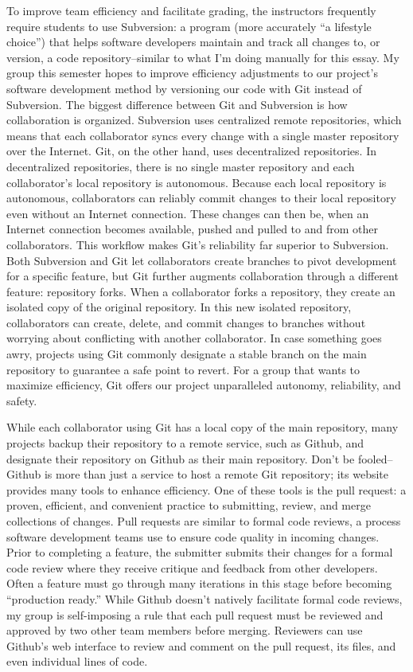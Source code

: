 To improve team efficiency and facilitate grading, the instructors frequently require students to use Subversion: a program (more accurately “a lifestyle choice”) that helps software developers maintain and track all changes to, or version, a code repository–similar to what I’m doing manually for this essay. My group this semester hopes to improve efficiency adjustments to our project’s software development method by versioning our code with Git instead of Subversion. The biggest difference between Git and Subversion is how collaboration is organized. Subversion uses centralized remote repositories, which means that each collaborator syncs every change with a single master repository over the Internet. Git, on the other hand, uses decentralized repositories. In decentralized repositories, there is no single master repository and each collaborator’s local repository is autonomous. Because each local repository is autonomous, collaborators can reliably commit changes to their local repository even without an Internet connection. These changes can then be, when an Internet connection becomes available, pushed and pulled to and from other collaborators. This workflow makes Git’s reliability far superior to Subversion. Both Subversion and Git let collaborators create branches to pivot development for a specific feature, but Git further augments collaboration through a different feature: repository forks. When a collaborator forks a repository, they create an isolated copy of the original repository. In this new isolated repository, collaborators can create, delete, and commit changes to branches without worrying about conflicting with another collaborator. In case something goes awry, projects using Git commonly designate a stable branch on the main repository to guarantee a safe point to revert. For a group that wants to maximize efficiency, Git offers our project unparalleled autonomy, reliability, and safety.

While each collaborator using Git has a local copy of the main repository, many projects backup their repository to a remote service, such as Github, and designate their repository on Github as their main repository. Don’t be fooled–Github is more than just a service to host a remote Git repository; its website provides many tools to enhance efficiency.  One of these tools is the pull request: a proven, efficient, and convenient practice to submitting, review, and merge collections of changes. Pull requests are similar to formal code reviews, a process software development teams use to ensure code quality in incoming changes. Prior to completing a feature, the submitter submits their changes for a formal code review where they receive critique and feedback from other developers. Often a feature must go through many iterations in this stage before becoming “production ready.” While Github doesn’t natively facilitate formal code reviews, my group is self-imposing a rule that each pull request must be reviewed and approved by two other team members before merging. Reviewers can use Github’s web interface to review and comment on the pull request, its files, and even individual lines of code. 

